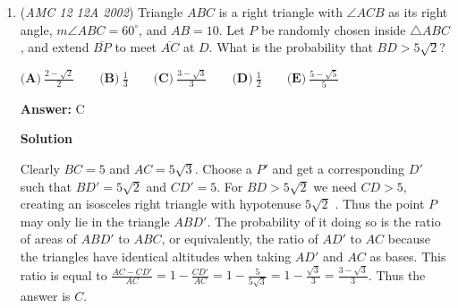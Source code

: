 \begin{enumerate}
 \textbf{Answer: }B



\textbf{Solution}

The sequence is infinite. As there are only $100$ pairs of digits, sooner or later a pair of consecutive digits will occur for the second time. As each next digit only depends on the previous two, from this point on the sequence will be periodic.

 (Additionally, as every two consecutive digits uniquely determine the \textit{previous} one as well, the first pair of digits that will occur twice must be the first pair $4,7$.)

 Hence it is a good idea to find the period. Writing down more terms of the sequence, we get:

 
 \[4,7,1,8,9,7,6,3,9,2,1,3,4,7,\dots\]

 and we found the period. The length of the period is $12$, and its sum is $4+7+\cdots+1+3 = 60$. Hence for each $k$ we have $S_{12k} = 60k$.

 We have $\lfloor 10000/60 \rfloor = 166$ and $166\cdot 12 = 1992$, therefore $S_{1992} = 60\cdot 166 = 9960$.The rest can now be computed by hand, we get $S_{1998} = 9960+4+7+1+8+9+7= 9996$, and $S_{1999}=9996 + 6 = 10002$, thus the answer is $\boxed{\text{(B) }1999}$.

 


	\item (\textit{AMC 12 12A 2002}) Triangle $ABC$ is a right triangle with $\angle ACB$ as its right angle, $m\angle ABC = 60^{\circ}$, and $AB = 10$. Let $P$ be randomly chosen inside $\triangle ABC$, and extend $\overline{BP}$ to meet $\overline{AC}$ at $D$. What is the probability that $BD > 5\sqrt{2}$?


 $\textbf{(A)}\ \frac{2-\sqrt2}{2}\qquad\textbf{(B)}\ \frac{1}{3}\qquad\textbf{(C)}\ \frac{3-\sqrt3}{3}\qquad\textbf{(D)}\ \frac{1}{2}\qquad\textbf{(E)}\ \frac{5-\sqrt5}{5}$

 \textbf{Answer: }C



\textbf{Solution}

Clearly $BC=5$ and $AC=5\sqrt{3}$. Choose a $P'$ and get a corresponding $D'$ such that $BD'= 5\sqrt{2}$ and $CD'=5$. For $BD > 5\sqrt2$ we need $CD>5$, creating an isosceles right triangle with hypotenuse $5\sqrt {2}$ . Thus the point $P$ may only lie in the triangle $ABD'$. The probability of it doing so is the ratio of areas of $ABD'$ to $ABC$, or equivalently, the ratio of $AD'$ to $AC$ because the triangles have identical altitudes when taking $AD'$ and $AC$ as bases. This ratio is equal to $\frac{AC-CD'}{AC}=1-\frac{CD'}{AC}=1-\frac{5}{5\sqrt{3}}=1-\frac{\sqrt{3}}{3}= \frac{3-\sqrt{3}}{3}$. Thus the answer is $\boxed{C}$.


\end{enumerate}
